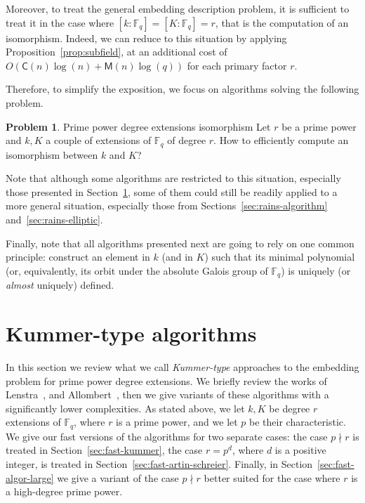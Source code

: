 \documentclass[12pt]{article}
\theoremstyle{plain}
\theoremstyle{definition}
\newtheorem*{problem}{Problem}
\def\F{\ensuremath{\mathbb{F}}}
\def\MM{\ensuremath{\mathsf{M}}}
\def\CC{\ensuremath{\mathsf{C}}}
\newcounter{algorithm}
\begin{document}
Moreover, to treat the general embedding description problem,
it is sufficient to treat it in the case where $[k:\F_q]=[K:\F_q]=r$,
that is the computation of an isomorphism.
Indeed, we can reduce to this situation by applying
Proposition~\ref{prop:subfield}, at an additional cost of
$O(\CC(n)\log(n) + \MM(n)\log(q))$ for each primary factor $r$.

Therefore, to simplify the exposition, we focus on algorithms
solving the following problem.
\begin{problem}{Prime power degree extensions isomorphism}
\label{prob:embedding}
Let $r$ be a prime power and $k, K$ a couple of extensions of $\F_q$
of degree $r$.
How to efficiently compute an isomorphism between $k$ and $K$?
\end{problem}
Note that although some algorithms are restricted to this situation,
especially those presented in Section~\ref{sec:kummer},
some of them could still be readily applied to a more general situation,
especially those from Sections~\ref{sec:rains-algorithm}
and~\ref{sec:rains-elliptic}.

Finally, note that
all algorithms presented next are going to rely on one common
principle: construct an element in $k$ (and in $K$) such that its
minimal polynomial (or, equivalently, its orbit under the absolute
Galois group of $\F_q$) is uniquely (or \emph{almost} uniquely)
defined.






\section{Kummer-type algorithms}
\label{sec:kummer}

In this section we review what we call \emph{Kummer-type} approaches to the embedding problem for prime power degree extensions. 
We briefly review the works of Lenstra~\cite{LenstraJr91},
and Allombert~\cite{Allombert02,Allombert02-rev}, then 
we give variants of these algorithms with a significantly lower complexities.
As stated above, we let $k, K$ be degree $r$ extensions of $\F_q$,
where $r$ is a prime power,
and we let $p$ be their characteristic.
We give our fast versions of the algorithms for two separate cases: the case $p \nmid r$
is treated in Section~\ref{sec:fast-kummer}, the case $r = p^d$, where $d$ 
is a positive integer, is treated in Section~\ref{sec:fast-artin-schreier}.
Finally, in Section~\ref{sec:fast-algor-large} we give a variant of the case
$p \nmid r$ better suited for the case where $r$ is a high-degree prime power.
\end{document}
